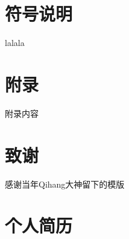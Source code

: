 \documentclass{tjumaster}
\begin{document}
	\makethesiscover %

	\frontmatter %

\begin{cabstract}
	
	
\end{cabstract}

\begin{eabstract}
		
	
\end{eabstract}

\tableofcontents  %
\clearpage %


\mainmatter %


\clearpage
\backmatter %


\tocless\section{符号说明}
lalala

\clearpage





\clearpage

\tocless \section{附录}
附录内容

\clearpage

\tocless \section{致谢}
	感谢当年Qihang大神留下的模版\cite{qihang}

\clearpage

\tocless \section{个人简历}
\end{document}
